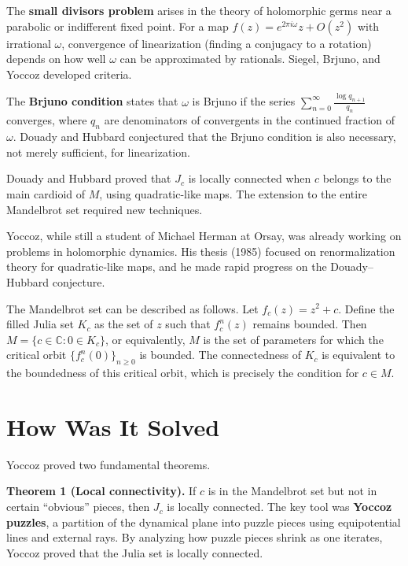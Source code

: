 The \textbf{small divisors problem} arises in the theory of
holomorphic germs near a parabolic or indifferent fixed point.  For
a map $f(z) = e^{2\pi i \omega} z + O(z^2)$ with irrational
$\omega$, convergence of linearization (finding a conjugacy to a
rotation) depends on how well $\omega$ can be approximated by
rationals.  Siegel, Brjuno, and Yoccoz developed criteria.

The \textbf{Brjuno condition} states that $\omega$ is Brjuno if
the series $\sum_{n=0}^{\infty}\frac{\log q_{n+1}}{q_n}$
converges, where $q_n$ are denominators of convergents in the
continued fraction of $\omega$.  Douady and Hubbard conjectured that
the Brjuno condition is also necessary, not merely sufficient, for
linearization.

Douady and Hubbard proved that $J_c$ is locally connected when $c$
belongs to the main cardioid of $M$, using quadratic-like maps.
The extension to the entire Mandelbrot set required new techniques.

Yoccoz, while still a student of Michael Herman at Orsay, was
already working on problems in holomorphic dynamics.  His thesis
(1985) focused on renormalization theory for quadratic-like maps,
and he made rapid progress on the Douady--Hubbard conjecture.

The Mandelbrot set can be described as follows.  Let
$f_c(z)=z^2+c$.  Define the filled Julia set $K_c$ as the set of
$z$ such that $f_c^n(z)$ remains bounded.  Then
$M=\{c\in\mathbb{C}: 0\in K_c\}$, or equivalently, $M$ is the set
of parameters for which the critical orbit
$\{f_c^n(0)\}_{n\geq 0}$ is bounded.  The connectedness of $K_c$ is
equivalent to the boundedness of this critical orbit, which is
precisely the condition for $c\in M$.

\section{How Was It Solved}

Yoccoz proved two fundamental theorems.

\textbf{Theorem 1 (Local connectivity).}
If $c$ is in the Mandelbrot set but not in certain ``obvious''
pieces, then $J_c$ is locally connected.  The key tool was
\textbf{Yoccoz puzzles}, a partition of the dynamical plane into
puzzle pieces using equipotential lines and external rays.  By
analyzing how puzzle pieces shrink as one iterates, Yoccoz proved
that the Julia set is locally connected.

